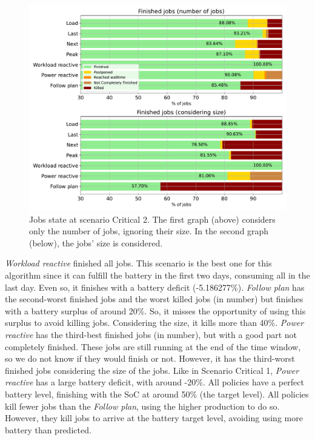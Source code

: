 \begin{figure}[!htb]
    \centering
    \includegraphics[scale=0.55]{Images/Compensations/jobs_critical_2.pdf}
    \caption{Jobs state at scenario Critical 2. The first graph (above) considers only the number of jobs, ignoring their size. In the second graph (below), the jobs' size is considered.}
    \label{fig:jobs_critical_2}
\end{figure}

\emph{Workload reactive} finished all jobs. This scenario is the best one for this algorithm since it can fulfill the battery in the first two days, consuming all in the last day. Even so, it finishes with a battery deficit (-5.186277\%). \emph{Follow plan} has the second-worst finished jobs and the worst killed jobs (in number) but finishes with a battery surplus of around 20\%. So, it misses the opportunity of using this surplus to avoid killing jobs. Considering the size, it kills more than 40\%. \emph{Power reactive} has the third-best finished jobs (in number), but with a good part not completely finished. These jobs are still running at the end of the time window, so we do not know if they would finish or not. However, it has the third-worst finished jobs considering the size of the jobs. Like in Scenario Critical 1, \emph{Power reactive} has a large battery deficit, with around -20\%. All policies have a perfect battery level, finishing with the SoC at around 50\% (the target level). All policies kill fewer jobs than the \emph{Follow plan}, using the higher production to do so. However, they kill jobs to arrive at the battery target level, avoiding using more battery than predicted.

